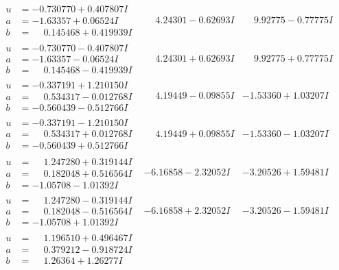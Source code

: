 \documentclass[1p]{elsarticle_modified}
\theoremstyle{definition}
\begin{document}
$$\begin{array}{c|c|c}
\begin{aligned}
u &= -0.730770 + 0.407807 I \\
a &= -1.63357 + 0.06524 I \\
b &= \phantom{-}0.145468 + 0.419939 I\end{aligned}
 & \phantom{-}4.24301 - 0.62693 I & \phantom{-}9.92775 - 0.77775 I \\ \hline\begin{aligned}
u &= -0.730770 - 0.407807 I \\
a &= -1.63357 - 0.06524 I \\
b &= \phantom{-}0.145468 - 0.419939 I\end{aligned}
 & \phantom{-}4.24301 + 0.62693 I & \phantom{-}9.92775 + 0.77775 I \\ \hline\begin{aligned}
u &= -0.337191 + 1.210150 I \\
a &= \phantom{-}0.534317 - 0.012768 I \\
b &= -0.560439 - 0.512766 I\end{aligned}
 & \phantom{-}4.19449 - 0.09855 I & -1.53360 + 1.03207 I \\ \hline\begin{aligned}
u &= -0.337191 - 1.210150 I \\
a &= \phantom{-}0.534317 + 0.012768 I \\
b &= -0.560439 + 0.512766 I\end{aligned}
 & \phantom{-}4.19449 + 0.09855 I & -1.53360 - 1.03207 I \\ \hline\begin{aligned}
u &= \phantom{-}1.247280 + 0.319144 I \\
a &= \phantom{-}0.182048 + 0.516564 I \\
b &= -1.05708 - 1.01392 I\end{aligned}
 & -6.16858 - 2.32052 I & -3.20526 + 1.59481 I \\ \hline\begin{aligned}
u &= \phantom{-}1.247280 - 0.319144 I \\
a &= \phantom{-}0.182048 - 0.516564 I \\
b &= -1.05708 + 1.01392 I\end{aligned}
 & -6.16858 + 2.32052 I & -3.20526 - 1.59481 I \\ \hline\begin{aligned}
u &= \phantom{-}1.196510 + 0.496467 I \\
a &= \phantom{-}0.379212 - 0.918724 I \\
b &= \phantom{-}1.26364 + 1.26277 I\end{aligned}

\end{array}$$
\end{document}
